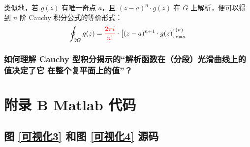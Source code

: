 \documentclass[UTF8]{report}
\theoremstyle{MyLineTheoremStyle} %
\theoremstyle{MyBlockTheoremStyle} %
\theoremstyle{MySubsubsectionStyle} %
\begin{document}
类似地，若 $g(z)$ 有唯一奇点 $a$，且 $(z - a)^n\cdot g(z) $ 在 $\overline{G}$ 上解析，便可以得到 $n$ 阶 Cauchy 积分公式的等价形式：
\begin{equation}
    \oint_{\partial G} g(z) = {\color{red} \frac{2\pi i}{n!}} \cdot \left[ (z - a)^{n+1}\cdot g(z) \right]^{(n)}_{z = a}
\end{equation}

\subsection{如何理解 Cauchy 型积分揭示的“解析函数在（分段）光滑曲线上的值决定了它 在整个复平面上的值”？}

\chapter*{附录 B\hspace*{20pt}  Matlab 代码}
\thispagestyle{fancy}
\setcounter{chapter}{2} 
\setcounter{equation}{0}    %
\setcounter{section}{0}   
\renewcommand\thesection{B.\arabic{section}}   
\renewcommand{\thefigure}{B.\arabic{figure}} 
\renewcommand{\thetable}{B.\arabic{table}}

\section{图 \ref{可视化3} 和图 \ref{可视化4} 源码}
\label{可视化34 源码}


\end{document}
